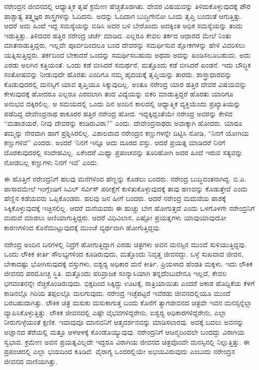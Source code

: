 ನರೇಂದ್ರನ ಜೀವನದಲ್ಲಿ ಆಧ್ಯಾತ್ಮಿಕ ತೃಷೆ ಕ್ರಮೇಣ ಹೆಚ್ಚತೊಡಗಿತು. ದೇವರ ವಿಷಯವನ್ನು ತಿಳಿದುಕೊಳ್ಳುವುದಕ್ಕೆ ಪೌರ ಪಾಶ್ಚಾತ್ಯ ತತ್ತ್ವಜ್ಞರ ಶಾಸ್ತ್ರಗಳನ್ನು ಓದಿದನು. ಅದನ್ನು ಓದಿದಾಗ ಬುದ್ಧಿಗೇನೋ ಒಂದು ತೃಪ್ತಿ ಬಂದಂತೆ ಆಗುತ್ತಿತ್ತು. ಆದರೆ ಅದು ಹಿಂದೆ ಇದ್ದ ಸಮಸ್ಯೆಯನ್ನು ಬಿಡಿಸಿ ಅದರ ಬಳಿ ಬೇರೊಂದು ಅದಕ್ಕಿಂತ ಅಧಿಕ ಸಮಸ್ಯೆಯನ್ನು ತಂದು ಇಡುತ್ತಿತ್ತು. ತಿಳಿದವರ ಹತ್ತಿರ ನರೇಂದ್ರ ಚರ್ಚೆ ಮಾಡಿದ. ಎಲ್ಲರೂ ಕೇವಲ ತರ್ಕದ ಆಧಾರದ ಮೇಲೆ ನಿಂತು ಮಾತನಾಡುತ್ತಿದ್ದರು, ಇಲ್ಲವೇ ಪೂರ್ವದಿಂದಲೂ ಬಂದ ದೇವರನ್ನು ಸಮರ್ಥಿಸುವ ಶ್ಲೋಕಗಳನ್ನು ಹೇಳಿ ವಿವರಿಸಲು ಯತ್ನಿಸುತ್ತಿದ್ದರು. ತರ್ಕದಿಂದ ಬೇಕಾದರೆ ಒಂದನ್ನು ಸಮರ್ಥಿಸಬಹುದು ಅಥವಾ ಅದನ್ನು ಖಂಡಿಸಲೂಬಹುದು. ಅದು ಎರಡು ಅಲಗಿನ ಕತ್ತಿಯಂತೆ. ಒಂದು ಕಡೆ ಬೀಸಿದರೆ ಸಮರ್ಥನೆ, ಮತ್ತೊಂದು ಕಡೆ ಬೀಸಿದರೆ ಖಂಡನೆ. ಇದು ಬೌದ್ಧಿಕ ಸಂತೋಷವನ್ನು ನೀಡುವುದೇ ಹೊರತು ಎಂದಿಗೂ ನಮ್ಮ ಹೃದಯಕ್ಕೆ ತೃಪ್ತಿಯನ್ನು ತಾರದು. ಶಾಸ್ತ್ರಾಧಾರವನ್ನು ಕೊಡುವುದರಲ್ಲಿ ಮನಸ್ಸಿಗೆ ಯಾವ ತೃಪ್ತಿಯೂ ಸಿಕ್ಕುವುದಿಲ್ಲ. ಅಂತೂ ನರೇಂದ್ರ ಯಾರ ಹತ್ತಿರ ದೇವರ ವಿಷಯವನ್ನು ಕೇಳುವುದಕ್ಕೆ ಹೋದರೂ ಎಲ್ಲರೂ ಎರವಲಾಗಿ ತಂದ ವಿದ್ಯೆಯನ್ನು ಬಿಕರಿ ಮಾಡುತ್ತಿದ್ದರೆ ಹೊರತು ಯಾರಿಗೂ ಅನುಭವ ದಕ್ಕಿರಲಿಲ್ಲ. ಆ ಸಮಯದಲ್ಲಿ ಒಂದು ದಿನ ಅಂದಿನ ಕಾಲದಲ್ಲಿ ಆಧ್ಯಾತ್ಮಿಕ ವ್ಯಕ್ತಿಯೆಂದು ಪ್ರಖ್ಯಾತಿಯನ್ನು ಪಡೆದಿದ್ದ ದೇವೇಂದ್ರನಾಥ ಠಾಕೂರರ ಹತ್ತಿರ ನರೇಂದ್ರ ಹೋದ. ಇದ್ದಕ್ಕಿದ್ದಂತೆಯೇ ನರೇಂದ್ರ ಅವರನ್ನು ಕೇಳಿದ “ಮಹಾಶಯರೆ, ನೀವು ದೇವರನ್ನು ಕಂಡಿರುವಿರಾ?” ಎಂದು. ದೇವೇಂದ್ರನಾಥರು ಅವಾಕ್ಕಾಗಿ ಹೋದರು. ಯಾರೂ ತಮ್ಮನ್ನು ನೇರವಾಗಿ ಹಾಗೆ ಪ್ರಶ್ನಿಸಿರಲಿಲ್ಲ. ವಿಶಾಲವಾದ ನರೇಂದ್ರನ ಕಣ್ಣುಗಳನ್ನೇ ದಿಟ್ಟಿಸಿ ನೋಡಿ, “ನಿನಗೆ ಯೋಗಿಯ ಕಣ್ಣುಗಳಿವೆ” ಎಂದರು. ಅಂದರೆ ‘ನಿನಗೆ ಇನ್ನೂ ಅದು ದೂರದ ವಸ್ತು. ಆದರೆ ಪ್ರಯತ್ನ ಮಾಡಿದರೆ ನಿನಗೆ ದೊರಕುವುದರಲ್ಲಿ ಸಂದೇಹವಿಲ್ಲ. ಏಕೆಂದರೆ ಮಿಥ್ಯಾ ಪ್ರಪಂಚವನ್ನು ತೂರಿಹೋಗಿ ಅದರ ಹಿಂದೆ ಇರುವ ಸತ್ಯವನ್ನು ನೋಡಬಲ್ಲ ಕಣ್ಣುಗಳು ನಿನಗೆ ಇವೆ’ ಎಂದು.

ಈ ಹೊತ್ತಿಗೆ ನರೇಂದ್ರನಿಗೆ ಹಲವು ಮನೆಗಳಿಂದ ಹೆಣ್ಣನ್ನು ಕೊಡಲು ಬಂದರು. ನರೇಂದ್ರ ಬುದ್ಧಿವಂತನಾಗಿದ್ದ. ಬಿ.ಎ. ಪಾಸಾದಮೇಲೆ ಇಂಗ್ಲೆಂಡಿಗೆ ಸಿವಿಲ್ ಸರ್ವಿಸ್ ಪರೀಕ್ಷೆಗೆ ಕುಳಿತುಕೊಳ್ಳುವುದಕ್ಕೆ ತಾವು ಹಣವನ್ನು ಕೊಡುತ್ತೇವೆ ಎಂದು ಹೆಣ್ಣಿನ ಕಡೆಯವರು ಒಪ್ಪಿಕೊಂಡರು. ಹಲವು ಜನ ಹೀಗೆ ಬಂದರು. ಆದರೆ ನರೇಂದ್ರ ಮದುವೆಯ ಪಾಶಕ್ಕೆ ಸಿಕ್ಕಿಕೊಳ್ಳುವುದಕ್ಕೆ ಇಚ್ಛಿಸಲಿಲ್ಲ. ಆದರೆ ಮನೆಯವರು ಈ ಹುಚ್ಚು ಬೇಗ ಹೋಗುತ್ತದೆ ಎಂದು ಒಳಗೊಳಗೇ ನರೇಂದ್ರನಿಗೆ ಮದುವೆ ಮಾಡಲು ಅಣಿಯಾಗುತ್ತಿದ್ದರು. ಆದರೆ ವಿಧಿವಿಲಾಸ, ಎಷ್ಟೋ ಪ್ರಯತ್ನಗಳು ಯಾವುಯಾವುದೋ ಕಾರಣಗಳಿಂದ ಕೊನೆಮುಟ್ಟುವುದಕ್ಕೆ ಮುಂಚೆ ವ್ಯರ್ಥವಾಗಿ ಹೋಗುತ್ತಿದ್ದವು.

\newpage

ನರೇಂದ್ರ ಅಂದಿನ ದಿನಗಳಲ್ಲಿ ನಿದ್ರೆಗೆ ಹೋಗುತ್ತಿದ್ದಾಗ ಎರಡು ಚಿತ್ರಗಳು ಅವನ ಮನಸ್ಸಿನ ಮುಂದೆ ಸುಳಿಯುತ್ತಿದ್ದವು. ಒಂದು ಲೌಕಿಕ ಕೀರ್ತಿ ಸೌಲಭ್ಯಗಳಿಂದ ಕೂಡಿರುವುದು, ಮತ್ತೊಂದು ನಿವೃತ್ತ ಜೀವನದ್ದು. ಒಳ್ಳೆ ಸುಖವಾದ ಜೀವನ, ಬೇಕಾದಷ್ಟು ಭೋಗಿಸುವುದಕ್ಕೆ ವಸ್ತುಗಳು, ಐಶ್ವರ‍್ಯ ಅಧಿಕಾರ ಮನೆ ಕೀರ್ತಿ, ಪ್ರಿಯಳಾದ ಹೆಂಡತಿ ಮಕ್ಕಳು, ಇದು ಲೌಕಿಕ ಜೀವನದ ಪರಮೋಚ್ಚ ಸ್ಥಿತಿ. ಮತ್ತೊಂದು ಪರಿವ್ರಾಜಕ ಸಂನ್ಯಾಸಿಯಾಗಿ ತನ್ನದೆಂಬುದೇನೂ ಇಲ್ಲದೆ, ಕೇವಲ ಭಗವಂತನನ್ನೇ ನೆಚ್ಚಿಕೊಂಡಿರುವುದು. ಭಿಕ್ಷದಿಂದ ಸಿಕ್ಕಿದ್ದು ಊಟಕ್ಕೆ, ರಾತ್ರಿಯಾಯಿತು ಎಂದರೆ ಆಕಾಶ ಹೊದ್ದಿಕೆಯ ಕೆಳಗೆ ಕಾಡಿನಲ್ಲೊ ಗಿರಿಯ ತಪ್ಪಲಲ್ಲೊ ಮಲಗುವುದು. ನರೇಂದ್ರ ಇಚ್ಛೆಪಟ್ಟರೆ ಇವೆರಡು ಜೀವನದಲ್ಲಿಯೂ ಮುಂದೆ ಬರಬಹುದಾಗಿತ್ತು. ಲೌಕಿಕ ಚಿತ್ರ ಮಸುಕು ಮಸುಕಾಗುತ್ತ ಬಂದು ಕೊನೆಗೆ ತ್ಯಾಗಜೀವನದ ಚಿತ್ರವೇ ಇವನ ಮನಸ್ಸನ್ನೆಲ್ಲಾ ವ್ಯಾಪಿಸಿಕೊಳ್ಳುತ್ತಿತ್ತು. ಲೌಕಿಕ ಜೀವನದಲ್ಲಿ ಎಷ್ಟೇ ವೈಭವಗಳಿದ್ದರೇನು, ಐಶ್ವರ‍್ಯ ಅಧಿಕಾರಗಳಿದ್ದರೇನು, ಎಲ್ಲಾ ನೀರುಗುಳ್ಳೆಯಂತೆ ಕ್ಷಣಿಕ. ಇವಾವುವೂ ಮಾನವನಿಗೆ ಆತ್ಮದರ್ಶನವನ್ನು ಮಾಡಿಸಲಾರವು. ಅದಕ್ಕೆ ಬದಲು ಅವನನ್ನು ಅಜ್ಞಾನದ ತೆರೆಯಲ್ಲಿ ಮತ್ತೂ ಆಳಆಳಕ್ಕೆ ಕೊಂಡೊಯ್ಯುವುವು. ನರೇಂದ್ರನಿಗೆ ಆಜನ್ಮದಿಂದಲೇ ಬಂದದ್ದು ವಿರಾಗಿಯ ಸ್ವಭಾವ. ಕ್ರಮೇಣ ಅವನ ಪ್ರಯತ್ನವಿಲ್ಲದೇ ಇದ್ದರೂ ವಿರಾಗಿಯ ಜೀವನದ ಚಿತ್ರವೊಂದೇ ಮನಸ್ಸಿನಲ್ಲಿ ನಿಲ್ಲುತ್ತಿತ್ತು. ಈ ಪ್ರಪಂಚದಲ್ಲಿ ಎಲ್ಲಾ ಭಯದಿಂದ ಕೂಡಿದೆ. ವೈರಾಗ್ಯ ಒಂದರಲ್ಲಿಯೇ ಅಭಯವಿರುವುದು ಎಂಬುದು ನರೇಂದ್ರನ ಜೀವನದ ವಾಣಿಯಗಿತ್ತು.

